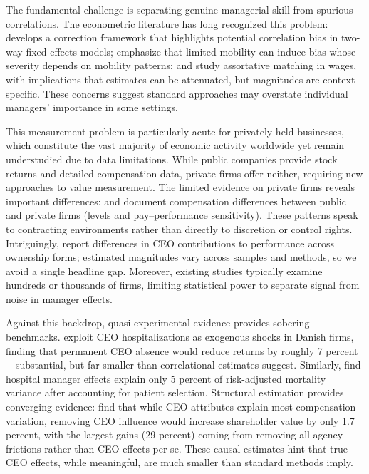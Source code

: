 \documentclass[11pt,a4paper]{article}
\begin{document}
The fundamental challenge is separating genuine managerial skill from spurious correlations. The econometric literature has long recognized this problem: \citet{gaure2014correlation} develops a correction framework that highlights potential correlation bias in two-way fixed effects models; \citet{bonhomme2023much} emphasize that limited mobility can induce bias whose severity depends on mobility patterns; and \citet{andrews2008high} study assortative matching in wages, with implications that estimates can be attenuated, but magnitudes are context-specific. These concerns suggest standard approaches may overstate individual managers’ importance in some settings.

This measurement problem is particularly acute for privately held businesses, which constitute the vast majority of economic activity worldwide yet remain understudied due to data limitations. While public companies provide stock returns and detailed compensation data, private firms offer neither, requiring new approaches to value measurement. The limited evidence on private firms reveals important differences: \citet{ColeMehran2008} and \citet{Gao2015-bw} document compensation differences between public and private firms (levels and pay–performance sensitivity). These patterns speak to contracting environments rather than directly to discretion or control rights. Intriguingly, \citet{Quigley2022-dq} report differences in CEO contributions to performance across ownership forms; estimated magnitudes vary across samples and methods, so we avoid a single headline gap. Moreover, existing studies typically examine hundreds or thousands of firms, limiting statistical power to separate signal from noise in manager effects.

Against this backdrop, quasi-experimental evidence provides sobering benchmarks. \citet{bennedsen2020ceos} exploit CEO hospitalizations as exogenous shocks in Danish firms, finding that permanent CEO absence would reduce returns by roughly 7 percent---substantial, but far smaller than correlational estimates suggest. Similarly, \citet{chandra2016health} find hospital manager effects explain only 5 percent of risk-adjusted mortality variance after accounting for patient selection. Structural estimation provides converging evidence: \citet{Page2018-pm} find that while CEO attributes explain most compensation variation, removing CEO influence would increase shareholder value by only 1.7 percent, with the largest gains (29 percent) coming from removing all agency frictions rather than CEO effects per se. These causal estimates hint that true CEO effects, while meaningful, are much smaller than standard methods imply.
\end{document}
